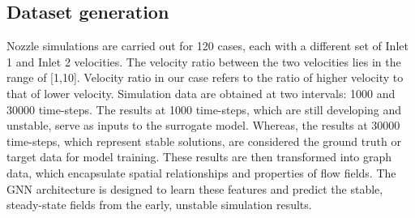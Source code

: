 \subsection{Dataset generation}
Nozzle simulations are carried out for 120 cases, each with a different set of Inlet 1 and Inlet 2 velocities. The velocity ratio between the two velocities lies in the range of [1,10]. Velocity ratio in our case refers to the ratio of higher velocity to that of lower velocity.
Simulation data are obtained at two intervals: 1000 and 30000 time-steps. The results at 1000 time-steps, which are still developing and unstable, serve as inputs to the surrogate model. Whereas, the results at 30000 time-steps, which represent stable solutions, are considered the ground truth or target data for model training. These results are then transformed into graph data, which encapsulate spatial relationships and properties of flow fields. The GNN architecture is designed to learn these features and predict the stable, steady-state fields from the early, unstable simulation results.
